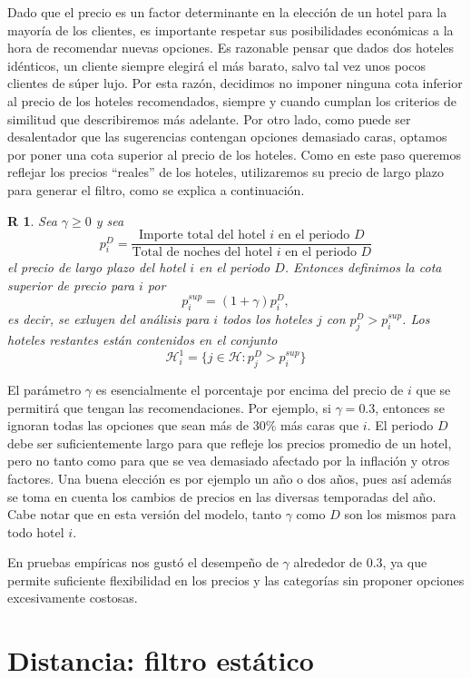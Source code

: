 \documentclass[12pt]{report}
\newtheorem{regla}{R}%
\begin{document}
Dado que el precio es un factor determinante en la elección de un hotel para la mayoría de los clientes, es importante respetar sus posibilidades económicas a la hora de recomendar nuevas opciones. Es razonable pensar que dados dos hoteles idénticos, un cliente siempre elegirá el más barato, salvo tal vez unos pocos clientes de súper lujo. Por esta razón, decidimos no imponer ninguna cota inferior al precio de los hoteles recomendados, siempre y cuando cumplan los criterios de similitud que describiremos más adelante. Por otro lado, como puede ser desalentador que las sugerencias contengan opciones demasiado caras, optamos por poner una cota superior al precio de los hoteles. Como en este paso queremos reflejar los precios ``reales'' de los hoteles, utilizaremos su precio de largo plazo para generar el filtro, como se explica a continuación.
\begin{regla}
Sea $\gamma \geq 0$ y sea
\[
p^D_i = \frac{\text{Importe total del hotel $i$ en el periodo $D$}}{\text{Total de noches del hotel $i$ en el periodo $D$}}
\]
el precio de largo plazo del hotel $i$ en el periodo $D$. Entonces definimos la cota superior de precio para $i$ por 
\[
p^{sup}_i = (1 + \gamma)p^D_i,
\]
es decir, se exluyen del análisis para $i$ todos los hoteles $j$ con $p^D_j > p^{sup}_i$. Los hoteles restantes están contenidos en el conjunto
\[
\mathcal{H}_i^1 = \{j \in \mathcal{H} : p^D_j > p^{sup}_i\}
\]
\end{regla}
El parámetro $\gamma$ es esencialmente el porcentaje por encima del precio de $i$ que se permitirá que tengan las recomendaciones. Por ejemplo, si $\gamma = 0.3$, entonces se ignoran todas las opciones que sean más de 30\% más caras que $i$. El periodo $D$ debe ser suficientemente largo para que refleje los precios promedio de un hotel, pero no tanto como para que se vea demasiado afectado por la inflación y otros factores. Una buena elección es por ejemplo un año o dos años, pues así además se toma en cuenta los cambios de precios en las diversas temporadas del año. Cabe notar que en esta versión del modelo, tanto $\gamma$ como $D$ son los mismos para todo hotel $i$.

En pruebas empíricas nos gustó el desempeño de $\gamma$ alrededor de 0.3, ya que permite suficiente flexibilidad en los precios y las categorías sin proponer opciones excesivamente costosas.

\section{Distancia: filtro estático}
\end{document}
